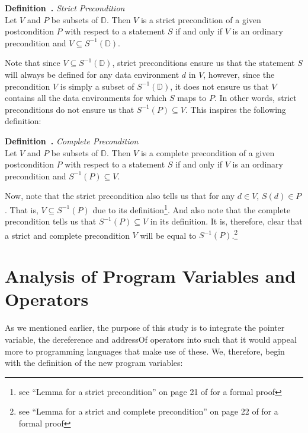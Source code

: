 \documentclass[11pt]{article}
\newcounter{definition}
\newenvironment{definition}[1][]{\stepcounter{definition}\par\medskip\noindent
\textbf{Definition~\thesection.\thedefinition #1} \rmfamily}{}
\newcounter{lemma}
\newcounter{theorem}
\newcounter{example}
\begin{document}
\begin{definition} \emph{Strict Precondition} \\
Let $V$ and $P$ be subsets of $\mathbb{D}$. Then $V$ is a strict precondition of a given postcondition $P$ with respect to a statement $S$ if and only if $V$ is an ordinary precondition and $V\subseteq S^{-1}(\mathbb{D})$. \medskip
\end{definition}

Note that since $V\subseteq S^{-1}(\mathbb{D})$, strict preconditions ensure us that the statement $S$ will always be defined for any data environment $d$ in $V$, however, since the precondition $V$ is simply a subset of $S^{-1}(\mathbb{D})$, it does not ensure us that $V$ contains all the data environments for which $S$ maps to $P$. In other words, strict preconditions do not ensure us that $S^{-1}(P)\subseteq V$. This inspires the following definition:

\begin{definition} \emph{Complete Precondition} \\
Let $V$ and $P$ be subsets of $\mathbb{D}$. Then $V$ is a complete precondition of a given postcondition $P$ with respect to a statement $S$ if and only if $V$ is an ordinary precondition and $S^{-1}(P)\subseteq V$. \medskip
\end{definition}

Now, note that the strict precondition also tells us that for any $d \in V$, $S(d) \in P$. That is, $V\subseteq S^{-1}(P)$ due to its definition\footnote{see ``Lemma for a strict precondition'' on page 21 of \cite{baber} for a formal proof}. And also note that the complete precondition tells us that  $S^{-1}(P)\subseteq V$ in its definition. It is, therefore, clear that a strict and complete precondition $V$ will be equal to $S^{-1}(P)$.\footnote{see ``Lemma for a strict and complete precondition'' on page 22 of \cite{baber} for a formal proof}


\section{Analysis of Program Variables and Operators}
\setcounter{definition}{0}
\setcounter{lemma}{0}
\setcounter{theorem}{0}
\setcounter{example}{0}

As we mentioned earlier, the purpose of this study is to integrate the pointer variable, the dereference and addressOf operators into \cite{baber} such that it would appeal more to programming languages that make use of these. We, therefore, begin with the definition of the new program variables:
\end{document}
